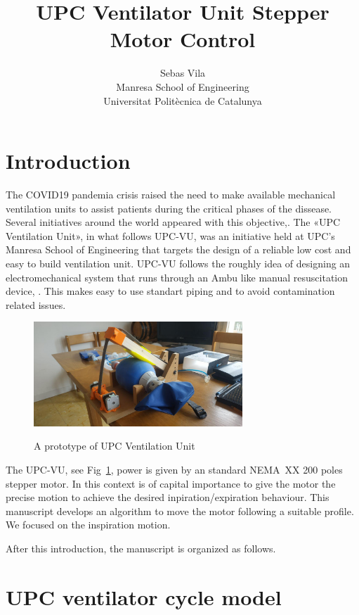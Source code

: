 \documentclass[a4paper]{article}
\title{UPC Ventilator Unit Stepper Motor Control}
\author{Sebas Vila\\Manresa School of Engineering\\Universitat
  Politècnica de Catalunya}
\begin{document}
\maketitle{}


\section{Introduction}
\label{sec:introduction}

The COVID19 pandemia crisis raised the need to make available
mechanical ventilation units to assist patients during the critical
phases of the dissease. Several initiatives around the world appeared
with this objective,\cite{}. The «UPC Ventilation Unit», in what
follows UPC-VU, was an initiative held at UPC's Manresa School of
Engineering that targets the design of a reliable low cost and easy to
build ventilation unit. UPC-VU follows the roughly idea of designing
an electromechanical system that runs through an Ambu like manual
resuscitation device, \cite{a.s.20:_ambu_oval_silic_resus}. This makes
easy to use standart piping and to avoid contamination related issues.

\begin{figure}[tb]
  \centering
  \includegraphics[width=0.7\textwidth]{upc-vu-v1}
  \label{fig:upc-vu}
  \caption{A prototype of UPC Ventilation Unit}
\end{figure}

The UPC-VU, see Fig~\ref{fig:upc-vu}, power is given by an standard
NEMA~XX 200 poles stepper motor. In this context is of capital
importance to give the motor the precise motion to achieve the desired
inpiration/expiration behaviour. This manuscript develops an algorithm
to move the motor following a suitable profile.
We focused on the inspiration motion.

After this introduction, the manuscript is organized as follows.

\section{UPC ventilator cycle model}
\end{document}
